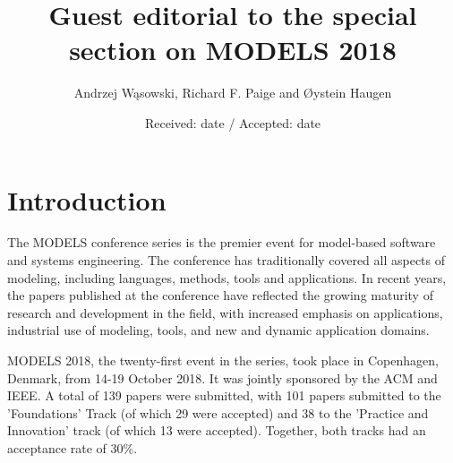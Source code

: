 \documentclass{svjour3}                     %
\begin{document}
\title{Guest editorial to the special section on MODELS 2018}


\author{Andrzej W\k{a}sowski, Richard F. Paige and \O ystein Haugen}



\date{Received: date / Accepted: date}


\maketitle

\section{Introduction}

The MODELS conference series is the premier event for model-based software and systems engineering. The conference
has traditionally covered all aspects of modeling, including languages, methods, tools and applications. In recent years,
the papers published at the conference have reflected the growing maturity of research and development in the field, with increased
emphasis on applications, industrial use of modeling, tools, and new and dynamic application domains.

MODELS 2018, the twenty-first event in the series, took place in Copenhagen, Denmark, from 14-19 October 2018. It was jointly sponsored
by the ACM and IEEE. A total of 139 papers were submitted, with 101 papers submitted to the 'Foundations' Track (of which 29 were
accepted) and 38 to the 'Practice and Innovation' track (of which 13 were accepted). Together, both tracks had an acceptance rate of
30\%.
\end{document}
